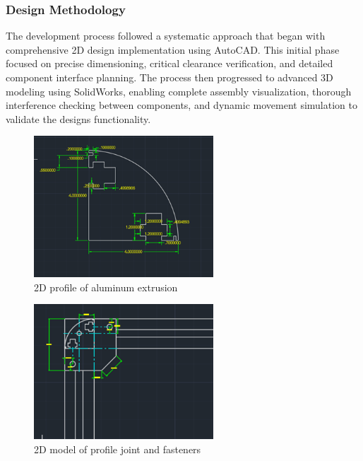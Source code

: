 \documentclass[../../main]{subfiles}
\begin{document}
\subsubsection{Design Methodology}\label{design-methodology}

The development process followed a systematic approach that began with
comprehensive 2D design implementation using AutoCAD. This initial phase
focused on precise dimensioning, critical clearance verification, and
detailed component interface planning. The process then progressed to
advanced 3D modeling using SolidWorks, enabling complete assembly
visualization, thorough interference checking between components, and
dynamic movement simulation to validate the design\textquotesingle s
functionality.

\begin{figure}[h!]
  \centering
  \includegraphics[width=0.6\textwidth]{img/image114.png}
  \caption{2D profile of aluminum extrusion}
  \end{figure}

  \begin{figure}[h!]
    \centering
    \includegraphics[width=0.6\textwidth]{img/image116.png}
    \caption{2D model of profile joint and fasteners}
    \end{figure}
\end{document}
